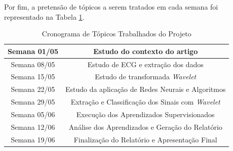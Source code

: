 \documentclass[conference]{IEEEtran}
\begin{document}
Por fim, a pretensão de tópicos a serem tratados em cada semana foi representado na Tabela \ref{table:cronogramaProjeto}.

%

\renewcommand\tablename{TABELA}
\begin{table}[!t]
\renewcommand{\arraystretch}{1.3}
\caption{Cronograma de Tópicos Trabalhados do Projeto}
\label{table:cronogramaProjeto}
\centering
\begin{tabular}{|c|c|}
\hline
Semana 01/05 & Estudo do contexto do artigo\\
\hline
Semana 08/05 & Estudo de ECG e extração dos dados\\
\hline
Semana 15/05 & Estudo de transformada \textit{Wavelet}\\
\hline
Semana 22/05 & Estudo da aplicação de Redes Neurais e Algoritmos\\
\hline
Semana 29/05 & Extração e Classificação dos Sinais com \textit{Wavelet}\\
\hline
Semana 05/06 & Execução dos Aprendizados Supervisionados\\
\hline
Semana 12/06 & Análise dos Aprendizados e Geração do Relatório\\
\hline
Semana 19/06 & Finalização do Relatório e Apresentação Final\\
\hline
\end{tabular}
\end{table}

\end{document}
